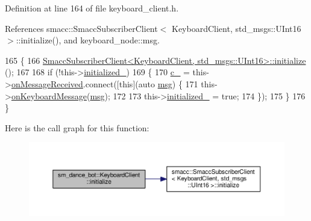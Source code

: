Definition at line 164 of file keyboard\+\_\+client.\+h.



References smacc\+::\+Smacc\+Subscriber\+Client$<$ Keyboard\+Client, std\+\_\+msgs\+::\+U\+Int16 $>$\+::initialize(), and keyboard\+\_\+node\+::msg.


\begin{DoxyCode}
165         \{
166                 
      \hyperlink{classsmacc_1_1SmaccSubscriberClient_afc2e5523c38250722e7197dd535599ce}{SmaccSubscriberClient<KeyboardClient, std\_msgs::UInt16>::initialize}
      ();
167 
168                 \textcolor{keywordflow}{if} (!this->\hyperlink{classsm__dance__bot_1_1KeyboardClient_a5bf3d8cf45c2915661b5218af8432206}{initialized\_})
169                 \{
170                         \hyperlink{classsm__dance__bot_1_1KeyboardClient_a7d49553efd214743c433e4b1a8c11aee}{c\_} = this->\hyperlink{classsmacc_1_1SmaccSubscriberClient_afa92da03ebd637e2565eee5cf226ca43}{onMessageReceived}.connect([\textcolor{keyword}{this}](\textcolor{keyword}{auto} 
      \hyperlink{namespacekeyboard__node_a768777e12f75b89e4a0a60acf748e9eb}{msg}) \{
171                                 this->\hyperlink{classsm__dance__bot_1_1KeyboardClient_a8018ccce8c7933a1d2034b8b4a60eb5f}{onKeyboardMessage}(\hyperlink{namespacekeyboard__node_a768777e12f75b89e4a0a60acf748e9eb}{msg});
172 
173                                 this->\hyperlink{classsm__dance__bot_1_1KeyboardClient_a5bf3d8cf45c2915661b5218af8432206}{initialized\_} = \textcolor{keyword}{true};
174                         \});
175                 \}
176         \}
\end{DoxyCode}


Here is the call graph for this function\+:
\nopagebreak
\begin{figure}[H]
\begin{center}
\leavevmode
\includegraphics[width=350pt]{classsm__dance__bot_1_1KeyboardClient_ad2fd8228e41b257c187ebef2d2a308fd_cgraph}
\end{center}
\end{figure}


